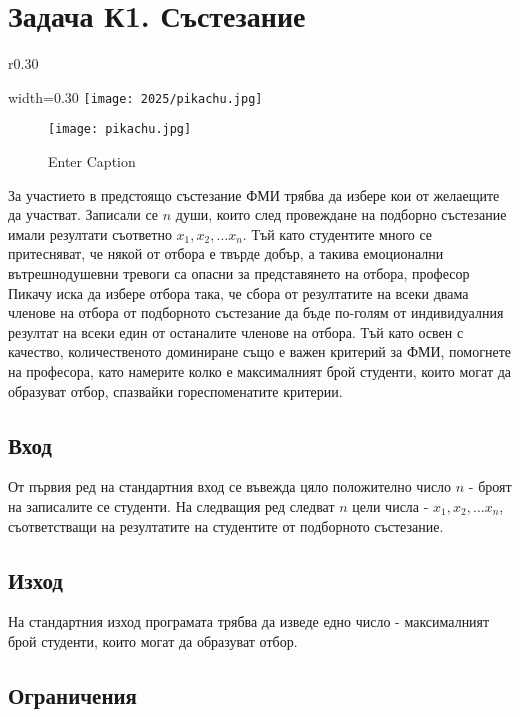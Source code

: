 \documentclass[12pt]{article}
\begin{document}
\section{Задача К1. Състезание}
\begin{wrapfigure}{r}{0.30\textwidth}
	\begin{adjustbox}{width=0.30\textwidth}
		\texttt{[image: 2025/pikachu.jpg]}
\begin{figure}
	    \centering
	    \texttt{[image: pikachu.jpg]}
	    \caption{Enter Caption}
	    \label{fig:enter-label}
	\end{figure}
		\end{adjustbox}
\end{wrapfigure}
За участието в предстоящо състезание ФМИ трябва да избере кои от желаещите да участват. Записали се $n$ души, които след провеждане на подборно състезание имали резултати съответно $x_1, x_2, \dots x_n$. Тъй като студентите много се притесняват, че някой от отбора е твърде добър, а такива емоционални вътрешнодушевни тревоги са опасни за представянето на отбора, професор Пикачу иска да избере отбора така, че сбора от резултатите на всеки двама членове на отбора от подборното състезание да бъде по-голям от индивидуалния резултат на всеки един от останалите членове на отбора. Тъй като освен с качество, количественото доминиране също е важен критерий за ФМИ, помогнете на професора, като намерите колко е максималният брой студенти, които могат да образуват отбор, спазвайки гореспоменатите критерии. 

\subsection{Вход}

От първия ред на стандартния вход се въвежда цяло положително число $n$ - броят
на записалите се студенти.
На следващия ред следват $n$ цели числа - $x_1, x_2, \dots x_n$, съответстващи на резултатите на студентите от подборното състезание.

\subsection{Изход}

На стандартния изход програмата трябва да изведе едно число - максималният брой студенти, които могат да образуват отбор.


\subsection{Ограничения}
\end{document}
